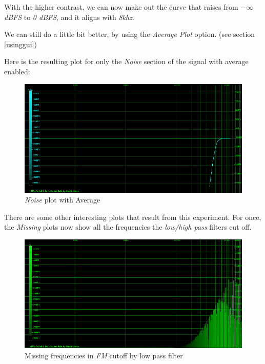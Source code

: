 \documentclass[10pt,a4paper]{report}
\begin{document}
With the higher contrast, we can now make out the curve that raises from \textit{$-\infty$ dBFS} to \textit{0 dBFS}, and it aligns with \textit{8khz}.

We can still do a little bit better, by using the \textit{Average Plot} option. (see section \ref{usinggui})

Here is the resulting plot for only the \textit{Noise} section of the signal with average enabled:

\begin{figure}[H]
	\centering
	\includegraphics[width=1.0\linewidth]{plots/Plot4-3-AVG-Noise}
	\caption[Noise Average]{\textit{Noise} plot with Average}
	\label{fig:plot4-3-avg-noise}
\end{figure}

There are some other interesting plots that result from this experiment. For once, the \textit{Missing} plots now show all the frequencies the \textit{low/high pass} filters cut off.

\begin{figure}[H]
	\centering
	\includegraphics[width=1.0\linewidth]{plots/Plot4-4-Missing-FM}
	\caption[Missing FM]{Missing frequencies in \textit{FM} cutoff by low pass filter}
	\label{fig:plot4-4-missing-fm}
\end{figure}
\end{document}
